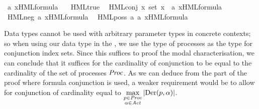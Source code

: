 \begin{isabellebody}
\begin{isamarkuptext}
\end{isamarkuptext}\isamarkuptrue%
\isamarkupfalse%
\ {\isacharparenleft}{\kern0pt}{\isacharprime}{\kern0pt}a{\isacharcomma}{\kern0pt}\ {\isacharprime}{\kern0pt}x{\isacharparenright}{\kern0pt}HML{\isacharunderscore}{\kern0pt}formula\ {\isacharequal}{\kern0pt}\isanewline
\ \ HML{\isacharunderscore}{\kern0pt}true\ \isanewline
{\isacharbar}{\kern0pt}\ HML{\isacharunderscore}{\kern0pt}conj\ {\isacartoucheopen}{\isacharprime}{\kern0pt}x\ set{\isacartoucheclose}\ {\isacartoucheopen}{\isacharprime}{\kern0pt}x\ {\isasymRightarrow}\ {\isacharparenleft}{\kern0pt}{\isacharprime}{\kern0pt}a{\isacharcomma}{\kern0pt}\ {\isacharprime}{\kern0pt}x{\isacharparenright}{\kern0pt}HML{\isacharunderscore}{\kern0pt}formula{\isacartoucheclose}\ \isanewline
{\isacharbar}{\kern0pt}\ HML{\isacharunderscore}{\kern0pt}neg\ {\isacartoucheopen}{\isacharparenleft}{\kern0pt}{\isacharprime}{\kern0pt}a{\isacharcomma}{\kern0pt}\ {\isacharprime}{\kern0pt}x{\isacharparenright}{\kern0pt}HML{\isacharunderscore}{\kern0pt}formula{\isacartoucheclose}\ \isanewline
{\isacharbar}{\kern0pt}\ HML{\isacharunderscore}{\kern0pt}poss\ {\isacartoucheopen}{\isacharprime}{\kern0pt}a{\isacartoucheclose}\ {\isacartoucheopen}{\isacharparenleft}{\kern0pt}{\isacharprime}{\kern0pt}a{\isacharcomma}{\kern0pt}\ {\isacharprime}{\kern0pt}x{\isacharparenright}{\kern0pt}HML{\isacharunderscore}{\kern0pt}formula{\isacartoucheclose}%
\isadelimdocument
%
\endisadelimdocument
%
\isatagdocument
%
\isamarkuptrue%
%
\endisatagdocument
{\isafolddocument}%
%
\isadelimdocument
%
\endisadelimdocument
%
\begin{isamarkuptext}%
Data types cannot be used with arbitrary parameter types  in concrete contexts; so when using our data type in the , we use the type of processes  as the type for conjunction index sets. Since this suffices to proof the modal characterisation, we can conclude that it suffices for the cardinality of conjunction to be equal to the cardinality of the set of processes $\mathit{Proc}$. As we can deduce from the part of the proof where formula conjunction is used, a weaker requirement would be to allow for conjunction of cardinality equal to $\displaystyle\max_{\substack{p\in\mathit{Proc} \\ \alpha\in\mathit{Act}}} |\text{Der}(p, \alpha)|$.


\end{isamarkuptext}
\end{isabellebody}

